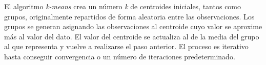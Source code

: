 \documentclass[11pt,a4paper]{article}
\begin{document}
\newpage
El algoritmo \textit{k-means} crea un número \textit{k} de centroides iniciales, tantos como grupos, originalmente repartidos de forma aleatoria entre las observaciones. Los grupos se generan asignando las observaciones al centroide cuyo valor se aproxime más al valor del dato. El valor del centroide se actualiza al de la media del grupo al que representa y vuelve a realizarse el paso anterior. El proceso es iterativo hasta conseguir convergencia o un número de iteraciones predeterminado.
\end{document}
